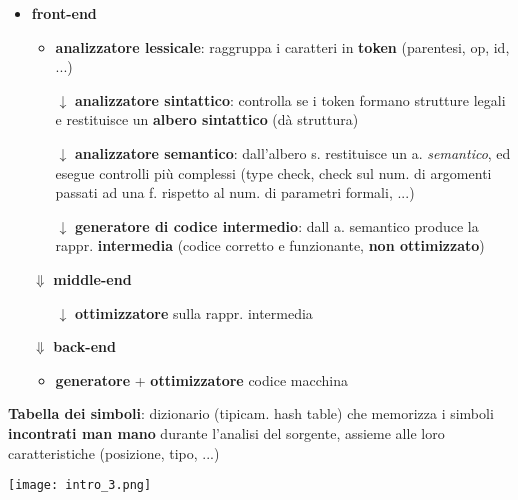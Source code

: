 \noindent
\begin{minipage}[c]{.55\textwidth}
\begin{itemize}
  \item \textbf{front-end}
    \begin{itemize}
      \item \textbf{analizzatore lessicale}: raggruppa i caratteri in \textbf{token} (parentesi, op, id, ...)
      \item[$\downarrow$] \textbf{analizzatore sintattico}: controlla se i token formano strutture legali e restituisce un \textbf{albero sintattico} (d\`a struttura)
      \item[$\downarrow$] \textbf{analizzatore semantico}: dall'albero s. restituisce un a. \textit{semantico}, ed esegue controlli pi\`u complessi (type check, check sul num. di argomenti passati ad una f. rispetto al num. di parametri formali, ...)
      \item[$\downarrow$] \textbf{generatore di codice intermedio}: dall a. semantico produce la rappr. \textbf{intermedia} (codice corretto e funzionante, \textbf{non ottimizzato}) 
    \end{itemize}
  \item[$\Downarrow$] \textbf{middle-end}
    \begin{itemize}
      \item[$\downarrow$] \textbf{ottimizzatore} sulla rappr. intermedia
    \end{itemize}
  \item[$\Downarrow$] \textbf{back-end}
    \begin{itemize}
      \item \textbf{generatore} + \textbf{ottimizzatore} codice macchina
    \end{itemize}
\end{itemize}
\end{minipage}\hfill
\begin{minipage}[c]{.4\textwidth}
\begin{mdframed}
  \textbf{Tabella dei simboli}: dizionario (tipicam. hash table) che memorizza i simboli \textbf{incontrati man mano} durante l'analisi del sorgente, assieme alle loro caratteristiche (posizione, tipo, ...)
\end{mdframed}
\texttt{[image: intro\_3.png]}
\end{minipage}\\




